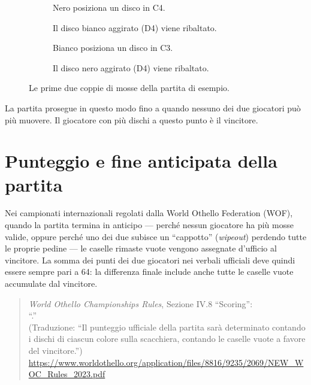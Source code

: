 \begin{figure}[htbp]
  \centering
  \begin{subfigure}[b]{0.45\textwidth}
    \centering
    \caption{Nero posiziona un disco in C4.}
  \end{subfigure}
  \hfill
  \begin{subfigure}[b]{0.45\textwidth}
    \centering
    \caption{Il disco bianco aggirato (D4) viene ribaltato.}
  \end{subfigure}

  \begin{subfigure}[b]{0.45\textwidth}
    \centering
    \caption{Bianco posiziona un disco in C3.}
  \end{subfigure}
  \hfill
  \begin{subfigure}[b]{0.45\textwidth}
    \centering
    \caption{Il disco nero aggirato (D4) viene ribaltato.}
  \end{subfigure}
  \caption{Le prime due coppie di mosse della partita di esempio.}
  \label{fig:rules-sg}
\end{figure}

La partita prosegue in questo modo fino a quando nessuno dei due giocatori può
più muovere. Il giocatore con più dischi a questo punto è il vincitore.

\section{Punteggio e fine anticipata della partita}

Nei campionati internazionali regolati dalla World Othello Federation (WOF),
quando la partita termina in anticipo — perché nessun giocatore ha più mosse
valide, oppure perché uno dei due subisce un ``cappotto'' (\emph{wipeout})
perdendo tutte le proprie pedine — le caselle rimaste vuote vengono assegnate
d'ufficio al vincitore. La somma dei punti dei due giocatori nei verbali
ufficiali deve quindi essere sempre pari a 64: la differenza finale include
anche tutte le caselle vuote accumulate dal vincitore.

\begin{quote}\small
\emph{World Othello Championships Rules}, Sezione IV.8 ``Scoring'':\\
``.''\\
(Traduzione: ``Il punteggio ufficiale della partita sarà determinato contando
i dischi di ciascun colore sulla scacchiera, contando le caselle vuote a
favore del vincitore.'')\\
\url{https://www.worldothello.org/application/files/8816/9235/2069/NEW_WOC_Rules_2023.pdf}
\end{quote}
